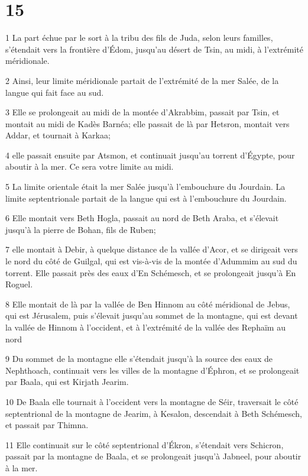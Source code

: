 \chapter{15}

\par 1 La part échue par le sort à la tribu des fils de Juda, selon leurs familles, s'étendait vers la frontière d'Édom, jusqu'au désert de Tsin, au midi, à l'extrémité méridionale.
\par 2 Ainsi, leur limite méridionale partait de l'extrémité de la mer Salée, de la langue qui fait face au sud.
\par 3 Elle se prolongeait au midi de la montée d'Akrabbim, passait par Tsin, et montait au midi de Kadès Barnéa; elle passait de là par Hetsron, montait vers Addar, et tournait à Karkaa;
\par 4 elle passait ensuite par Atsmon, et continuait jusqu'au torrent d'Égypte, pour aboutir à la mer. Ce sera votre limite au midi.
\par 5 La limite orientale était la mer Salée jusqu'à l'embouchure du Jourdain. La limite septentrionale partait de la langue qui est à l'embouchure du Jourdain.
\par 6 Elle montait vers Beth Hogla, passait au nord de Beth Araba, et s'élevait jusqu'à la pierre de Bohan, fils de Ruben;
\par 7 elle montait à Debir, à quelque distance de la vallée d'Acor, et se dirigeait vers le nord du côté de Guilgal, qui est vis-à-vis de la montée d'Adummim au sud du torrent. Elle passait près des eaux d'En Schémesch, et se prolongeait jusqu'à En Roguel.
\par 8 Elle montait de là par la vallée de Ben Hinnom au côté méridional de Jebus, qui est Jérusalem, puis s'élevait jusqu'au sommet de la montagne, qui est devant la vallée de Hinnom à l'occident, et à l'extrémité de la vallée des Rephaïm au nord
\par 9 Du sommet de la montagne elle s'étendait jusqu'à la source des eaux de Nephthoach, continuait vers les villes de la montagne d'Éphron, et se prolongeait par Baala, qui est Kirjath Jearim.
\par 10 De Baala elle tournait à l'occident vers la montagne de Séir, traversait le côté septentrional de la montagne de Jearim, à Kesalon, descendait à Beth Schémesch, et passait par Thimna.
\par 11 Elle continuait sur le côté septentrional d'Ékron, s'étendait vers Schicron, passait par la montagne de Baala, et se prolongeait jusqu'à Jabneel, pour aboutir à la mer.
